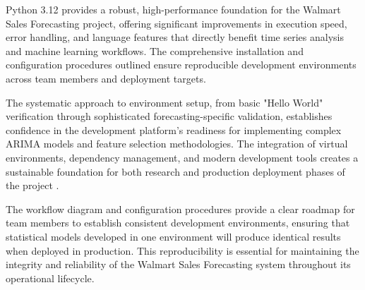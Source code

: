 Python 3.12 provides a robust, high-performance foundation for the Walmart Sales Forecasting project, offering significant improvements in execution speed, error handling, and language features that directly benefit time series analysis and machine learning workflows. The comprehensive installation and configuration procedures outlined ensure reproducible development environments across team members and deployment targets.

The systematic approach to environment setup, from basic "Hello World" verification through sophisticated forecasting-specific validation, establishes confidence in the development platform's readiness for implementing complex ARIMA models and feature selection methodologies. The integration of virtual environments, dependency management, and modern development tools creates a sustainable foundation for both research and production deployment phases of the project \cite{Box:2016}\cite{Montgomery:2008}\cite{Guyon:2003}.

The workflow diagram and configuration procedures provide a clear roadmap for team members to establish consistent development environments, ensuring that statistical models developed in one environment will produce identical results when deployed in production. This reproducibility is essential for maintaining the integrity and reliability of the Walmart Sales Forecasting system throughout its operational lifecycle.

